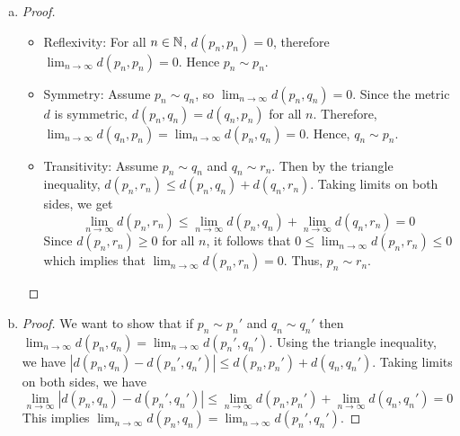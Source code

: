 \documentclass[11pt]{article}
\begin{document}
\begin{exercise}{24}
    \begin{enumerate} [(a)]
        \item \begin{proof}
            \begin{itemize}
                \item Reflexivity: For all $n \in \mathbb{N}$, $d(p_n, p_n) = 0$, therefore $\lim_{n \to \infty} d(p_n, p_n) = 0$. Hence $p_n \sim p_n$. 
                \item Symmetry: Assume $p_n \sim q_n$, so $\lim_{n \to \infty} d(p_n, q_n) = 0$. Since the metric $d$ is symmetric, $d(p_n, q_n) = d(q_n, p_n)$ for all $n$. Therefore, $\lim_{n \to \infty} d(q_n, p_n) = \lim_{n \to \infty} d(p_n, q_n) = 0$. Hence, $q_n \sim p_n$. 
                \item Transitivity: Assume $p_n \sim q_n$ and $q_n \sim r_n$. Then by the triangle inequality, $d(p_n, r_n) \le d(p_n, q_n) + d(q_n, r_n)$. Taking limits on both sides, we get $$\lim_{n \to \infty} d(p_n, r_n) \le \lim_{n \to \infty} d(p_n, q_n) + \lim_{n \to \infty} d(q_n, r_n) = 0$$ Since $d(p_n, r_n) \ge 0$ for all $n$, it follows that $0 \le \lim_{n \to \infty} d(p_n, r_n) \le 0$ which implies that $\lim_{n \to \infty} d(p_n, r_n) = 0$. Thus, $p_n \sim r_n$. 
            \end{itemize}
        \end{proof}
        \item \begin{proof}
            We want to show that if $p_n \sim p_n'$ and $q_n \sim q_n'$ then $\lim_{n \to \infty} d(p_n, q_n) = \lim_{n \to \infty} d(p_n', q_n')$. Using the triangle inequality, we have $|d(p_n, q_n) - d(p_n', q_n')| \le d(p_n, p_n') + d(q_n, q_n')$. Taking limits on both sides, we have $$\lim_{n \to \infty} |d(p_n, q_n) - d(p_n', q_n')| \le \lim_{n \to \infty} d(p_n, p_n') + \lim_{n \to \infty} d(q_n, q_n') = 0$$ This implies $\lim_{n \to \infty} d(p_n, q_n) = \lim_{n \to \infty} d(p_n', q_n')$. 


\end{proof}
\end{enumerate}
\end{exercise}
\end{document}
